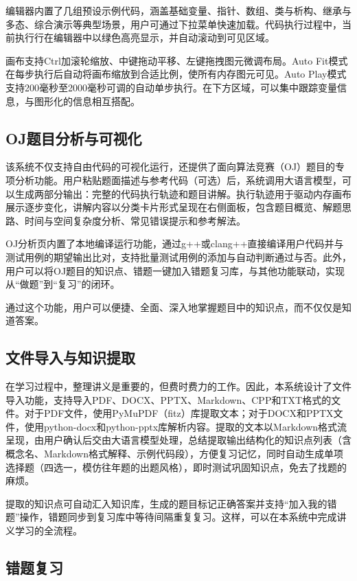 \documentclass[12pt,a4paper]{ctexart}
\begin{document}
编辑器内置了几组预设示例代码，涵盖基础变量、指针、数组、类与析构、继承与多态、综合演示等典型场景，用户可通过下拉菜单快速加载。代码执行过程中，当前执行行在编辑器中以绿色高亮显示，并自动滚动到可见区域。

画布支持Ctrl加滚轮缩放、中键拖动平移、左键拖拽图元微调布局。Auto Fit模式在每步执行后自动将画布缩放到合适比例，使所有内存图元可见。Auto Play模式支持200毫秒至2000毫秒可调的自动单步执行。在下方区域，可以集中跟踪变量信息，与图形化的信息相互搭配。

\subsection{OJ题目分析与可视化}

该系统不仅支持自由代码的可视化运行，还提供了面向算法竞赛（OJ）题目的专项分析功能。用户粘贴题面描述与参考代码（可选）后，系统调用大语言模型，可以生成两部分输出：完整的代码执行轨迹和题目讲解。执行轨迹用于驱动内存画布展示逐步变化，讲解内容以分类卡片形式呈现在右侧面板，包含题目概览、解题思路、时间与空间复杂度分析、常见错误提示和参考解法。

OJ分析页内置了本地编译运行功能，通过g++或clang++直接编译用户代码并与测试用例的期望输出比对，支持批量测试用例的添加与自动判断通过与否。此外，用户可以将OJ题目的知识点、错题一键加入错题复习库，与其他功能联动，实现从“做题”到“复习”的闭环。

通过这个功能，用户可以便捷、全面、深入地掌握题目中的知识点，而不仅仅是知道答案。

\subsection{文件导入与知识提取}

在学习过程中，整理讲义是重要的，但费时费力的工作。因此，本系统设计了文件导入功能，支持导入PDF、DOCX、PPTX、Markdown、CPP和TXT格式的文件。对于PDF文件，使用PyMuPDF（fitz）库提取文本；对于DOCX和PPTX文件，使用python-docx和python-pptx库解析内容。提取的文本以Markdown格式流呈现，由用户确认后交由大语言模型处理，总结提取输出结构化的知识点列表（含概念名、Markdown格式解释、示例代码段），方便复习记忆，同时自动生成单项选择题（四选一，模仿往年题的出题风格），即时测试巩固知识点，免去了找题的麻烦。

提取的知识点可自动汇入知识库，生成的题目标记正确答案并支持“加入我的错题”操作，错题同步到复习库中等待间隔重复复习。这样，可以在本系统中完成讲义学习的全流程。

\subsection{错题复习}
\end{document}
